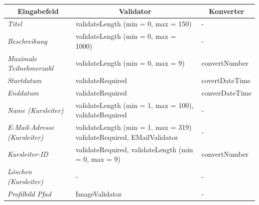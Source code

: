 \begin{itemize}
\begin{center}
\begin{longtable}{|p{3cm} |p{8cm} | p{5cm}|}
						\hline \multicolumn{1}{|c|}{\textbf{Eingabefeld}} & \multicolumn{1}{|c|}{\textbf{Validator}} & \multicolumn{1}{|c|}{\textbf{Konverter}} \\ \hline
						\endfirsthead
						\hline
						\endlastfoot
						\textit{Titel} & validateLength (min = 0, max = 150) & - \\ \hline
						\textit{Beschreibung} & validateLength (min = 0, max = 1000) & - \\ \hline
						\textit{Maximale Teilnehmerzahl} & validateLength (min = 0, max = 9) & convertNumber \\ \hline
						\textit{Startdatum} & validateRequired & covertDateTime \\ \hline
						\textit{Enddatum} & validateRequired & converDateTime \\ \hline
						\textit{Name (Kursleiter)} & validateLength (min = 1, max = 100), validateRequired & - \\ \hline
						\textit{E-Mail-Adresse (Kursleiter)} & validateLength (min = 1, max = 319) validateRequired, EMailValidator & - \\ \hline
						\textit{Kursleiter-ID} & validateRequired, validateLength (min = 0, max = 9) & convertNumber \\ \hline
						\textit{Löschen (Kursleiter)} & - & - \\ \hline
						\textit{Profilbild Pfad} & ImageValidator & - \\ \hline
					\end{longtable}
				\end{center}
				

\end{itemize}
